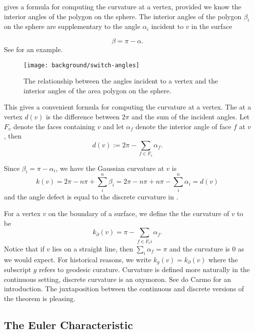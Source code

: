  gives a formula for computing the curvature at a vertex, provided
we know the interior angles of the polygon on the sphere.
The interior angles of the polygon $\beta_i$ on the sphere are supplementary to
the angle $\alpha_i$ incident to $v$ in the surface

\begin{equation} \label{eqn:switcheroo}
\beta=\pi-\alpha.
\end{equation}
See  for an example.




\begin{figure}[htb]
\centering
\texttt{[image: background/switch-angles]}
\caption{The relationship between the angles incident to a vertex and
the interior angles of the area polygon on the sphere.}
\label{fig:switcheroo}
\end{figure}




This gives a convenient formula for computing the curvature at a vertex.
The  at a vertex $d(v)$ is the difference between $2\pi$ and
the sum of the incident angles.  Let $F_v$ denote the faces containing $v$  
and let $\alpha_f$  denote the interior  angle of face $f$ at $v$, then
$$d(v):=2\pi -\sum_{f\in F_v}\alpha_f.$$

Since $\beta_i=\pi-\alpha_i$, we have the Gaussian curvature at $v$
is 
$$k(v)=2\pi -n\pi+\sum_{i}^n \beta_i=2\pi-n\pi +n\pi -\sum_i^n\alpha_i=d(v)$$
 and the
 angle defect is equal to the discrete curvature in .


For a vertex $v$ on the boundary of a surface, we define the the curvature
of $v$  to be 
$$k_{\partial}(v)= \pi-\sum_{f\in F_vi}\alpha_f.$$
Notice that if $v$ lies on a straight line, then $\sum_{i}\alpha_f=\pi$
and the curvature is $0$ as we would expect.
For historical reasons,  we write $k_g(v)=k_{\partial}(v)$
where the subscript $g$ refers to geodesic curature.
Curvature is defined more naturally in the continuous setting,
discrete curvature is an oxymoron.  See do Carmo \cite{doc76} for an introduction.
The juxtaposition between the continuous and discrete versions of the theorem
is pleasing.





\subsection{The Euler Characteristic}

